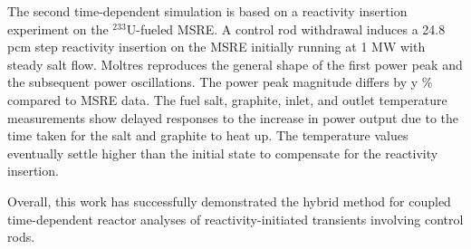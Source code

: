 The second time-dependent simulation is based on a reactivity insertion experiment on the
$^{233}$U-fueled \gls{MSRE}. A control rod withdrawal induces a 24.8 pcm step reactivity
insertion on the \gls{MSRE} initially running at 1 MW with steady salt flow. Moltres reproduces
the general shape of the first power peak and the subsequent power oscillations. The power peak
magnitude differs by y \% compared to \gls{MSRE} data. The fuel
salt, graphite, inlet, and outlet temperature measurements show delayed responses to the increase
in power output due to the time taken for the salt and graphite to heat up. The temperature values
eventually settle higher than the initial
state to compensate for the reactivity insertion.

Overall, this work has successfully demonstrated the hybrid method for coupled time-dependent
reactor analyses of reactivity-initiated transients involving control rods.

